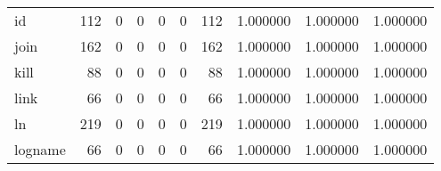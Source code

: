 \begin{tabular}{lrrrrrrrrr}
id        &                                   112 &                                                  0 &                                                  0 &                                                  0 &                                                  0 &                                                112 &                                           1.000000 &                               1.000000 &                             1.000000 \\
join      &                                   162 &                                                  0 &                                                  0 &                                                  0 &                                                  0 &                                                162 &                                           1.000000 &                               1.000000 &                             1.000000 \\
kill      &                                    88 &                                                  0 &                                                  0 &                                                  0 &                                                  0 &                                                 88 &                                           1.000000 &                               1.000000 &                             1.000000 \\
link      &                                    66 &                                                  0 &                                                  0 &                                                  0 &                                                  0 &                                                 66 &                                           1.000000 &                               1.000000 &                             1.000000 \\
ln        &                                   219 &                                                  0 &                                                  0 &                                                  0 &                                                  0 &                                                219 &                                           1.000000 &                               1.000000 &                             1.000000 \\
logname   &                                    66 &                                                  0 &                                                  0 &                                                  0 &                                                  0 &                                                 66 &                                           1.000000 &                               1.000000 &                             1.000000 \\

\end{tabular}
